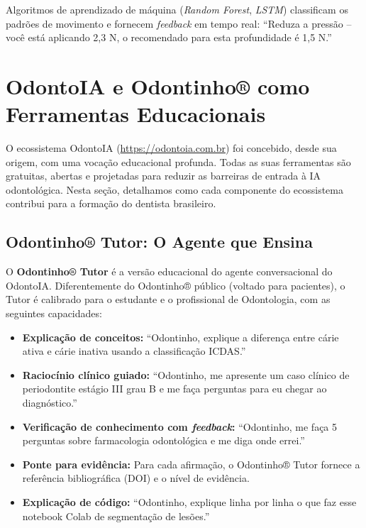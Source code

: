Algoritmos de aprendizado de máquina (\textit{Random Forest}, \textit{LSTM})
classificam os padrões de movimento e fornecem \textit{feedback} em tempo real:
``Reduza a pressão -- você está aplicando 2,3 N, o recomendado para esta
profundidade é 1,5 N.''


\section{OdontoIA e Odontinho® como Ferramentas Educacionais}
\label{sec:odontoia-educacional}

\nivelquatro

O ecossistema OdontoIA (\url{https://odontoia.com.br}) foi concebido, desde sua
origem, com uma vocação educacional profunda. Todas as suas ferramentas são
gratuitas, abertas e projetadas para reduzir as barreiras de entrada à IA
odontológica. Nesta seção, detalhamos como cada componente do ecossistema
contribui para a formação do dentista brasileiro.

 

\subsection{Odontinho® Tutor: O Agente que Ensina}

O \textbf{Odontinho® Tutor} é a versão educacional do agente conversacional do
OdontoIA. Diferentemente do Odontinho® público (voltado para pacientes), o Tutor
é calibrado para o estudante e o profissional de Odontologia, com as seguintes
capacidades:

\begin{itemize}
  \item \textbf{Explicação de conceitos:} ``Odontinho, explique a diferença
    entre cárie ativa e cárie inativa usando a classificação ICDAS.''
  \item \textbf{Raciocínio clínico guiado:} ``Odontinho, me apresente um caso
    clínico de periodontite estágio III grau B e me faça perguntas para eu
    chegar ao diagnóstico.''
  \item \textbf{Verificação de conhecimento com \textit{feedback}:} ``Odontinho,
    me faça 5 perguntas sobre farmacologia odontológica e me diga onde errei.''
  \item \textbf{Ponte para evidência:} Para cada afirmação, o Odontinho® Tutor
    fornece a referência bibliográfica (DOI) e o nível de evidência.
  \item \textbf{Explicação de código:} ``Odontinho, explique linha por linha o
    que faz esse notebook Colab de segmentação de lesões.''
\end{itemize}

